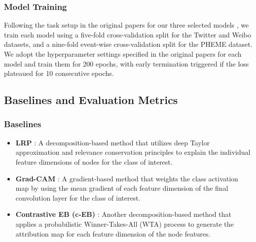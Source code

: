 \subsubsection{Model Training} 
Following the task setup in the original papers for our three selected models \cite{Bian2020RumorDO, wei-etal-2021-towards, lin-etal-2021-rumor}, we train each model using a five-fold cross-validation split for the Twitter and Weibo datasets, and a nine-fold event-wise cross-validation split for the PHEME dataset. We adopt the hyperparameter settings specified in the original papers for each model and train them for 200 epochs, with early termination triggered if the loss plateaued for 10 consecutive epochs.


\subsection{Baselines and Evaluation Metrics}
\subsubsection{Baselines}
\begin{itemize} 
    \item \textbf{LRP} \cite{bach2015pixel}: A decomposition-based method that utilizes deep Taylor approximation and relevance conservation principles to explain the individual feature dimensions of nodes for the class of interest. 
    \item \textbf{Grad-CAM} \cite{Selvaraju2017ICCV}: A gradient-based method that weights the class activation map by using the mean gradient of each feature dimension of the final convolution layer for the class of interest. 
    \item \textbf{Contrastive EB (c-EB)} \cite{zhang2018top}: Another decomposition-based method that applies a probabilistic Winner-Takes-All (WTA) process to generate the attribution map for each feature dimension of the node features. 
\end{itemize}

